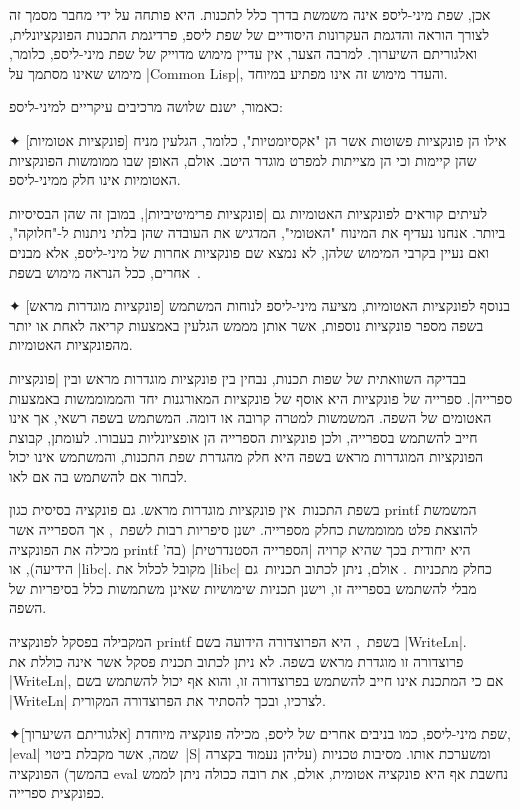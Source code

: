 אכן, שפת מיני-ליספ אינה משמשת בדרך כלל לתכנות. היא פותחה על ידי מחבר מסמך זה
לצורך הוראה והדגמת העקרונות היסודיים של שפת ליספ, פרדיגמת התכנות הפונקציונלית,
ואלגוריתם השיערוך. למרבה הצער, אין עדיין מימוש מדוייק של שפת מיני-ליספ, כלומר,
מימוש שאינו מסתמך על \E|Common Lisp|, והעדר מימוש זה אינו מפתיע במיוחד.

כאמור, ישנם שלושה מרכיבים עיקריים למיני-ליספ:
\begin{description}
  ✦ [פונקציות אטומיות] אילו הן פונקציות פשוטות אשר הן "אקסיומטיות", כלומר,
  הגלעין מניח שהן קיימות וכי הן מצייתות למפרט מוגדר היטב. אולם, האופן שבו
  ממומשות הפונקציות האטומיות אינו חלק ממיני-ליספ.

  לעיתים קוראים לפונקציות האטומיות גם \ע|פונקציות פרימיטיביות|, במובן זה שהן
  הבסיסיות ביותר. אנחנו נעדיף את המינוח "האטומי", המדגיש את העובדה שהן בלתי
  ניתנות ל-"חלוקה", ואם נעיין בקרבי המימוש שלהן, לא נמצא שם פונקציות אחרות של
  מיני-ליספ, אלא מבנים אחרים, ככל הנראה מימוש בשפת~\CPL.

  ✦ [פונקציות מוגדרות מראש] בנוסף לפונקציות האטומיות, מציעה מיני-ליספ לנוחות
  המשתמש בשפה מספר פונקציות נוספות, אשר אותן מממש הגלעין באמצעות קריאה
  לאחת או יותר מהפונקציות האטומיות.

  בבדיקה השוואתית של שפות תכנות, נבחין בין פונקציות מוגדרות מראש ובין
  \ע|פונקציות ספרייה|. ספרייה של פונקציות היא אוסף של פונקציות המאורגנות יחד
  והממוממשות באמצעות האטומים של השפה. המשמשות למטרה קרובה או דומה. המשתמש בשפה
  רשאי, אך אינו חייב להשתמש בספרייה, ולכן פונקציות הספרייה הן אופציונליות
  בעבורו. לעומתן, קבוצת הפונקציות המוגדרות מראש בשפה היא חלק מהגדרת שפת התכנות,
  והמשתמש אינו יכול לבחור אם להשתמש בה אם לאו.

  בשפת התכנות~\CPL אין פונקציות מוגדרות מראש. גם פונקציה בסיסית כגון printf
  המשמשת להוצאת פלט ממוממשת כחלק מספרייה. ישנן סיפריות רבות לשפת~\CPL, אך
  הספרייה אשר מכילה את הפונקציה printf היא יחודית בכך שהיא קרויה \ע|הספרייה
  הסטנדרטית| (בה' הידיעה), או \E|libc|. מקובל לכלול את \E|libc| כחלק
  מתכניות~\CPL. אולם, ניתן לכתוב תכניות~\CPL גם מבלי להשתמש בספרייה זו, וישנן
  תכניות שימושיות שאינן משתמשות כלל בסיפריות של השפה.

  המקבילה בפסקל לפונקציה printf בשפת~\CPL, היא הפרוצדורה הידועה בשם
  \E|WriteLn|. פרוצדורה זו מוגדרת מראש בשפה. לא ניתן לכתוב תכנית פסקל אשר אינה
  כוללת את \E|WriteLn|, אם כי המתכנת אינו חייב להשתמש בפרוצדורה זו, והוא אף
  יכול להשתמש בשם \E|WriteLn| לצרכיו, ובכך להסתיר את הפרוצדורה המקורית.

  ✦[אלגוריתם השיערוך] שפת מיני-ליספ, כמו בניבים אחרים של ליספ, מכילה פונקציה
  מיוחדת, \E|eval| שמה, אשר מקבלת ביטוי~\E|S| ומשערכת אותו. מסיבות טכניות
  (עליהן נעמוד בקצרה בהמשך) הפונקציה eval נחשבת אף היא פונקציה אטומית, אולם, את
  רובה ככולה ניתן לממש כפונקצית ספרייה.
\end{description}

